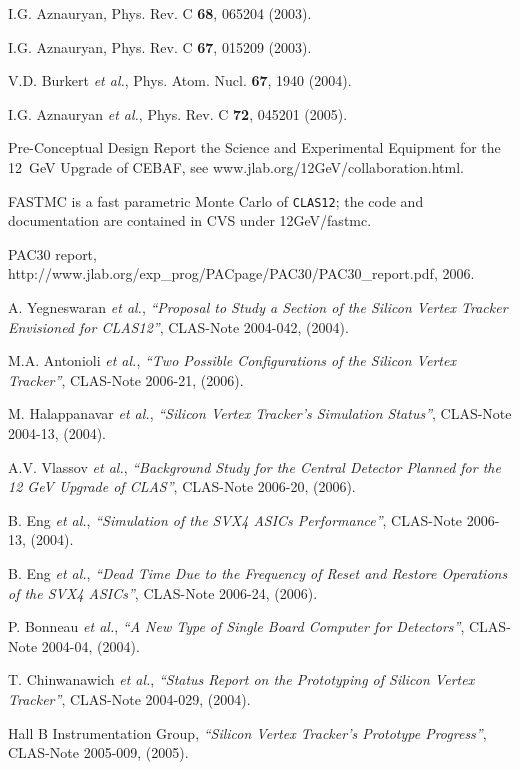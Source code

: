 \begin{thebibliography}{199}
I.G. Aznauryan, Phys. Rev. C {\bf 68}, 065204 (2003).

I.G. Aznauryan, Phys. Rev. C {\bf 67}, 015209 (2003).

V.D. Burkert {\it et al.}, Phys. Atom. Nucl. {\bf 67}, 1940 (2004).

I.G. Aznauryan {\it et al.}, Phys. Rev. C {\bf 72}, 045201 (2005).

%
%

Pre-Conceptual Design Report the Science and Experimental Equipment
for the 12~GeV Upgrade of CEBAF, see www.jlab.org/12GeV/collaboration.html.

FASTMC is a fast parametric Monte Carlo of {\tt CLAS12}; the code and 
documentation are contained in CVS under 12GeV/fastmc.

PAC30 report, http://www.jlab.org/exp\_prog/PACpage/PAC30/PAC30\_report.pdf,
2006.

A. Yegneswaran {\it et al.}, {\it ``Proposal to Study a Section of the 
Silicon Vertex Tracker Envisioned for CLAS12''}, CLAS-Note 2004-042, (2004).

M.A. Antonioli {\it et al.}, {\it ``Two Possible Configurations of the 
Silicon Vertex Tracker''}, CLAS-Note 2006-21, (2006).

M. Halappanavar {\it et al.}, {\it ``Silicon Vertex Tracker's Simulation 
Status''}, CLAS-Note 2004-13, (2004).

A.V. Vlassov {\it et al.}, {\it ``Background Study for the Central Detector 
Planned for the 12 GeV Upgrade of CLAS''}, CLAS-Note 2006-20, (2006).

B. Eng {\it et al.}, {\it ``Simulation of the SVX4 ASICs Performance''}, 
CLAS-Note 2006-13, (2004).

B. Eng {\it et al.}, {\it ``Dead Time Due to the Frequency of Reset and 
Restore Operations of the SVX4 ASICs''}, CLAS-Note 2006-24, (2006).

P. Bonneau {\it et al.}, {\it ``A New Type of Single Board Computer for 
Detectors''}, CLAS-Note 2004-04, (2004).

T. Chinwanawich {\it et al.}, {\it ``Status Report on the Prototyping of 
Silicon Vertex Tracker''}, CLAS-Note 2004-029, (2004).

Hall B Instrumentation Group, {\it ``Silicon Vertex Tracker's Prototype 
Progress''}, CLAS-Note 2005-009, (2005).


\end{thebibliography}
